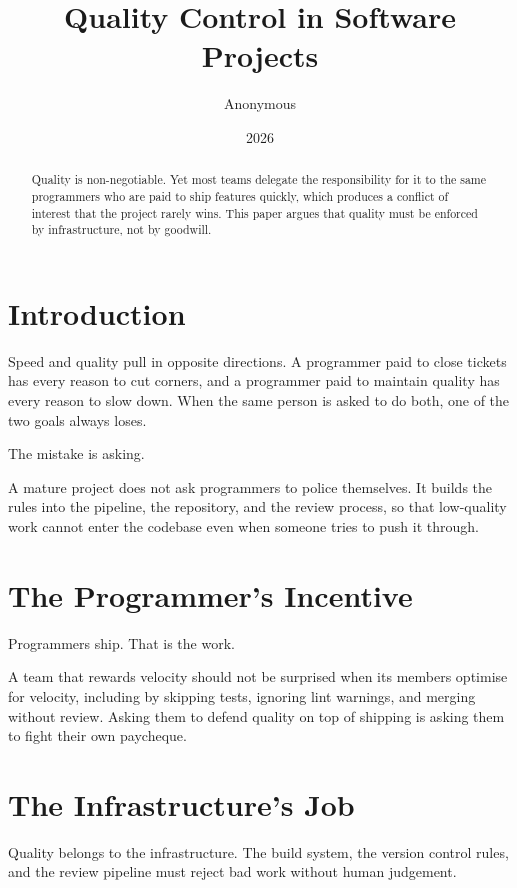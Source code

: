 \documentclass{article}
\title{Quality Control in Software Projects}
\author{Anonymous}
\date{2026}
\begin{document}
\maketitle

\begin{abstract}
Quality is non-negotiable.
Yet most teams delegate the responsibility for it to the same
  programmers who are paid to ship features quickly, which produces
  a conflict of interest that the project rarely wins.
This paper argues that quality must be enforced by infrastructure,
  not by goodwill.
\end{abstract}

\section{Introduction}

Speed and quality pull in opposite directions.
A programmer paid to close tickets has every reason to cut corners,
  and a programmer paid to maintain quality has every reason to slow
  down.
When the same person is asked to do both, one of the two goals
  always loses.

The mistake is asking.

A mature project does not ask programmers to police themselves.
It builds the rules into the pipeline, the repository, and the
  review process, so that low-quality work cannot enter the codebase
  even when someone tries to push it through.

\section{The Programmer's Incentive}

Programmers ship.
That is the work.

A team that rewards velocity should not be surprised when its
  members optimise for velocity, including by skipping tests,
  ignoring lint warnings, and merging without review.
Asking them to defend quality on top of shipping is asking them to
  fight their own paycheque.

\section{The Infrastructure's Job}

Quality belongs to the infrastructure.
The build system, the version control rules, and the review pipeline
  must reject bad work without human judgement.
\end{document}
